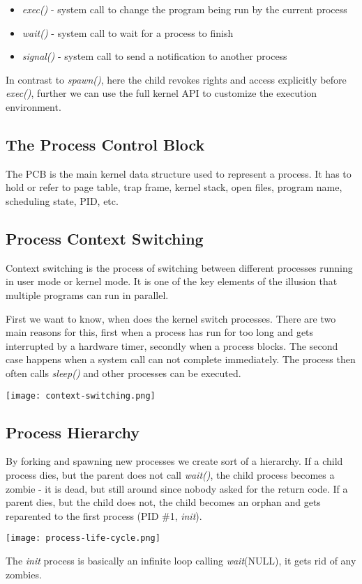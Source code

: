 \begin{itemize}
	\item \textit{exec()} - system call to change the program being run by the current process
	\item \textit{wait()} - system call to wait for a process to finish
	\item \textit{signal()} - system call to send a notification to another process
\end{itemize}

In contrast to \textit{spawn()}, here the child revokes rights and access explicitly before \textit{exec()}, further we can use the full kernel API to customize the execution environment.


\subsection{The Process Control Block}

The PCB is the main kernel data structure used to represent a process. It has to hold or refer to page table, trap frame, kernel stack, open files, program name, scheduling state, PID, etc.


\subsection{Process Context Switching}

Context switching is the process of switching between different processes running in user mode or kernel mode. It is one of the key elements of the illusion that multiple programs can run in parallel.

First we want to know, when does the kernel switch processes. There are two main reasons for this, first when a process has run for too long and gets interrupted by a hardware timer, secondly when a process blocks. The second case happens when a system call can not complete immediately. The process then often calls \textit{sleep()} and other processes can be executed.
\begin{center}
	\texttt{[image: context-switching.png]}
\end{center}


\subsection{Process Hierarchy}

By forking and spawning new processes we create sort of a hierarchy. If a child process dies, but the parent does not call \textit{wait()}, the child process becomes a zombie - it is dead, but still around since nobody asked for the return code. If a parent dies, but the child does not, the child becomes an orphan and gets reparented to the first process (PID \#1, \textit{init}).
\begin{center}
	\texttt{[image: process-life-cycle.png]}
\end{center}

The \textit{init} process is basically an infinite loop calling \textit{wait}(NULL), it gets rid of any zombies.